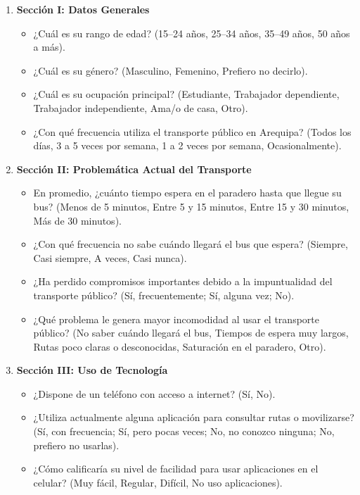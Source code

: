 \begin{enumerate}
    \item \textbf{Sección I: Datos Generales}
    \begin{itemize}
        \item ¿Cuál es su rango de edad? (15--24 años, 25--34 años, 35--49 años, 50 años a más).
        \item ¿Cuál es su género? (Masculino, Femenino, Prefiero no decirlo).
        \item ¿Cuál es su ocupación principal? (Estudiante, Trabajador dependiente, Trabajador independiente, Ama/o de casa, Otro).
        \item ¿Con qué frecuencia utiliza el transporte público en Arequipa? (Todos los días, 3 a 5 veces por semana, 1 a 2 veces por semana, Ocasionalmente).
    \end{itemize}
    
    \item \textbf{Sección II: Problemática Actual del Transporte}
    \begin{itemize}
        \item En promedio, ¿cuánto tiempo espera en el paradero hasta que llegue su bus? (Menos de 5 minutos, Entre 5 y 15 minutos, Entre 15 y 30 minutos, Más de 30 minutos).
        \item ¿Con qué frecuencia no sabe cuándo llegará el bus que espera? (Siempre, Casi siempre, A veces, Casi nunca).
        \item ¿Ha perdido compromisos importantes debido a la impuntualidad del transporte público? (Sí, frecuentemente; Sí, alguna vez; No).
        \item ¿Qué problema le genera mayor incomodidad al usar el transporte público? (No saber cuándo llegará el bus, Tiempos de espera muy largos, Rutas poco claras o desconocidas, Saturación en el paradero, Otro).
    \end{itemize}

    \item \textbf{Sección III: Uso de Tecnología}
    \begin{itemize}
        \item ¿Dispone de un teléfono con acceso a internet? (Sí, No).
        \item ¿Utiliza actualmente alguna aplicación para consultar rutas o movilizarse? (Sí, con frecuencia; Sí, pero pocas veces; No, no conozco ninguna; No, prefiero no usarlas).
        \item ¿Cómo calificaría su nivel de facilidad para usar aplicaciones en el celular? (Muy fácil, Regular, Difícil, No uso aplicaciones).
    \end{itemize}


\end{enumerate}
